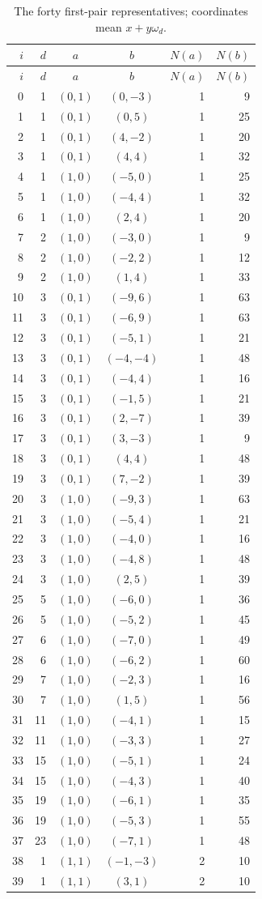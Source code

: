 \documentclass[12pt]{article}
\numberwithin{equation}{section}
\begin{document}
\begingroup\small
\setlength{\tabcolsep}{5pt}
\begin{longtable}{r|r|c|c|r|r}
\caption{The forty first-pair representatives; coordinates mean $x+y\omega_d$.}\label{tab:pr-forty-pairs}\\
$i$&$d$&$a$&$b$&$N(a)$&$N(b)$\\\hline\endfirsthead
$i$&$d$&$a$&$b$&$N(a)$&$N(b)$\\\hline\endhead
0&1&$(0,1)$&$(0,-3)$&1&9\\
1&1&$(0,1)$&$(0,5)$&1&25\\
2&1&$(0,1)$&$(4,-2)$&1&20\\
3&1&$(0,1)$&$(4,4)$&1&32\\
4&1&$(1,0)$&$(-5,0)$&1&25\\
5&1&$(1,0)$&$(-4,4)$&1&32\\
6&1&$(1,0)$&$(2,4)$&1&20\\
7&2&$(1,0)$&$(-3,0)$&1&9\\
8&2&$(1,0)$&$(-2,2)$&1&12\\
9&2&$(1,0)$&$(1,4)$&1&33\\
10&3&$(0,1)$&$(-9,6)$&1&63\\
11&3&$(0,1)$&$(-6,9)$&1&63\\
12&3&$(0,1)$&$(-5,1)$&1&21\\
13&3&$(0,1)$&$(-4,-4)$&1&48\\
14&3&$(0,1)$&$(-4,4)$&1&16\\
15&3&$(0,1)$&$(-1,5)$&1&21\\
16&3&$(0,1)$&$(2,-7)$&1&39\\
17&3&$(0,1)$&$(3,-3)$&1&9\\
18&3&$(0,1)$&$(4,4)$&1&48\\
19&3&$(0,1)$&$(7,-2)$&1&39\\
20&3&$(1,0)$&$(-9,3)$&1&63\\
21&3&$(1,0)$&$(-5,4)$&1&21\\
22&3&$(1,0)$&$(-4,0)$&1&16\\
23&3&$(1,0)$&$(-4,8)$&1&48\\
24&3&$(1,0)$&$(2,5)$&1&39\\
25&5&$(1,0)$&$(-6,0)$&1&36\\
26&5&$(1,0)$&$(-5,2)$&1&45\\
27&6&$(1,0)$&$(-7,0)$&1&49\\
28&6&$(1,0)$&$(-6,2)$&1&60\\
29&7&$(1,0)$&$(-2,3)$&1&16\\
30&7&$(1,0)$&$(1,5)$&1&56\\
31&11&$(1,0)$&$(-4,1)$&1&15\\
32&11&$(1,0)$&$(-3,3)$&1&27\\
33&15&$(1,0)$&$(-5,1)$&1&24\\
34&15&$(1,0)$&$(-4,3)$&1&40\\
35&19&$(1,0)$&$(-6,1)$&1&35\\
36&19&$(1,0)$&$(-5,3)$&1&55\\
37&23&$(1,0)$&$(-7,1)$&1&48\\
38&1&$(1,1)$&$(-1,-3)$&2&10\\
39&1&$(1,1)$&$(3,1)$&2&10\\
\end{longtable}
\end{document}
